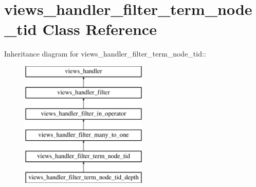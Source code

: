 \hypertarget{classviews__handler__filter__term__node__tid}{
\section{views\_\-handler\_\-filter\_\-term\_\-node\_\-tid Class Reference}
\label{classviews__handler__filter__term__node__tid}
}
Inheritance diagram for views\_\-handler\_\-filter\_\-term\_\-node\_\-tid::\begin{figure}[H]
\begin{center}
\leavevmode
\includegraphics[height=6cm]{classviews__handler__filter__term__node__tid}
\end{center}
\end{figure}
